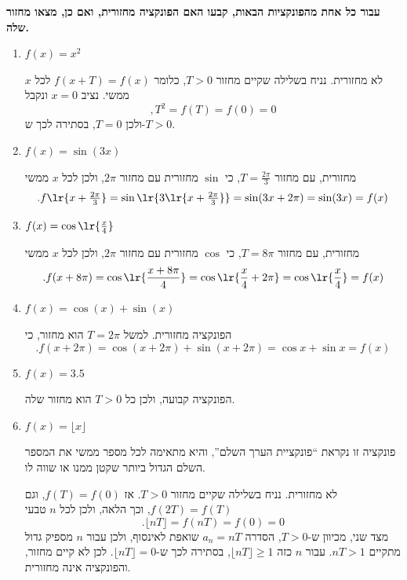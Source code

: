 \textbf{עבור כל אחת מהפונקציות הבאות, קבעו האם הפונקציה מחזורית, ואם כן, מצאו מחזור שלה.}
\begin{enumerate}
\item $f(x)=x^2$
\begin{solbox}
לא מחזורית. נניח בשלילה שקיים מחזור $T>0$, כלומר
$f(x+T)=f(x)$
לכל $x$ ממשי. נציב $x=0$ ונקבל
$$,T^2=f(T)=f(0)=0$$
ולכן $T=0$, בסתירה לכך ש-$T>0$.
\end{solbox}

\item $f(x)=\sin(3x)$
\begin{solbox}
מחזורית, עם מחזור
$T = \frac{2 \pi}{3}$,
כי
$\sin$
מחזורית עם מחזור $2\pi$, ולכן לכל $x$ ממשי
$$.f\lr{x+\tfrac{2\pi}{3}}=\sin\lr{3\lr{x+\tfrac{2\pi}{3}}}=\sin(3x+2\pi)=\sin(3x)=f(x)$$
\end{solbox}

\item $f(x)=\cos\lr{\frac{x}{4}}$
\begin{solbox}
מחזורית, עם מחזור
$T = 8 \pi$,
כי
$\cos$
מחזורית עם מחזור $2\pi$, ולכן לכל $x$ ממשי
$$.f(x+8\pi)=\cos\lr{\frac{x+8\pi}{4}}=\cos\lr{\frac x4+2\pi}=\cos\lr{\frac x4}=f(x)$$
\end{solbox}

\item $f(x) =\cos(x)+\sin(x) $
\begin{solbox}
הפונקציה מחזורית. למשל $T=2\pi$ הוא מחזור, כי
\[
.f(x+2\pi)=\cos(x+2\pi)+\sin(x+2\pi)=\cos x+\sin x=f(x)
\]
\end{solbox}

\item $f(x) = 3.5 $
\begin{solbox}
הפונקציה קבועה, ולכן כל $T>0$ הוא מחזור שלה.
\end{solbox}

\item $f(x)=\lfloor x \rfloor$

פונקציה זו נקראת ``פונקציית הערך השלם'', והיא מתאימה לכל מספר ממשי את המספר השלם הגדול ביותר שקטן ממנו או שווה לו.
\begin{solbox}
לא מחזורית. נניח בשלילה שקיים מחזור $T>0$. אז
$f(T)=f(0)$,
וגם
$f(2T)=f(T)$,
וכך הלאה, ולכן לכל $n$ טבעי
$$.\lfloor nT\rfloor=f(nT)=f(0)=0$$
מצד שני, מכיוון ש-$T>0$, הסדרה
$a_n=nT$
שואפת לאינסוף, ולכן עבור $n$ מספיק גדול מתקיים $nT>1$. עבור $n$ כזה
$\lfloor nT\rfloor\geq1$,
בסתירה לכך ש-$\lfloor nT\rfloor=0$.
לכן לא קיים מחזור, והפונקציה אינה מחזורית.
\end{solbox}


\end{enumerate}
